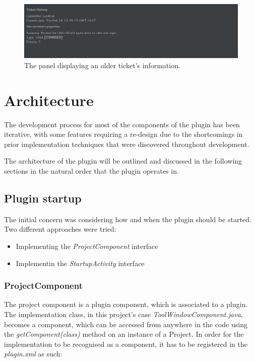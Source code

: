 \documentclass{4thYearProject}
\begin{document}
\begin{figure}[H]
\includegraphics[scale=0.6]{OldTicket_infopanel}
\centering
\caption{The panel displaying an older ticket's information.}\label{oldticketpanel}
\label{fig:oldticketpanel}
\end{figure}


\chapter{Architecture}

The development process for most of the components of the plugin has been iterative, with some features requiring a re-design due to the shortcomings in prior implementation techniques that were discovered throughout development. 

The architecture of the plugin will be outlined and discussed in the following sections in the natural order that the plugin operates in. 

\section{Plugin startup}

The initial concern was considering how and when the plugin should be started. Two different approaches were tried:
\begin{itemize}
\item Implementing the \textit{ProjectComponent} interface  
\item Implementin the \textit{StartupActivity} interface 
\end{itemize}

\subsection{ProjectComponent}

The project component is a plugin component, which is associated to a plugin. The implementation class, in this project's case \textit{ToolWindowComponent.java}, becomes a component, which can be accessed from anywhere in the code using the \textit{getComponent(class)} method on an instance of a Project. In order for the implementation to be recognised as a component, it has to be registered in the \textit{plugin.xml} as such:\\
\end{document}
